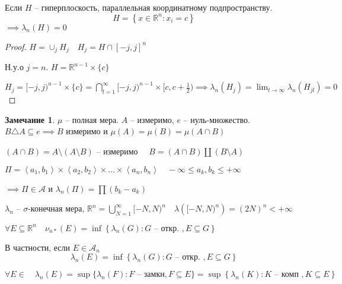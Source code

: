 \documentclass{book}
\newcommand\R{\ensuremath{\mathbb{R}}}
\theoremstyle{definition}
\newtheorem*{note}{Замечание}
\begin{document}
\begin{definition}
    Если $H$ -- гиперплоскость, параллельная координатному подпространству.  \[H = \left\{ x\in \R^n: x_i = c \right\} \] $\implies \lambda_n(H) = 0$
\end{definition}
\begin{proof}
    $H = \cup_j H_j\quad H_j = H \cap [-j,j]^n$

    Н.у.о $j = n$.  $H = \R^{n-1}\times \{c\}$

    $H_j = [-j,j)^{n-1} \times \{c\} = \bigcap\limits_{l=1} ^{\infty } [-j,j)^{n-1}\times [c,c+\frac{1}{2}) \implies \lambda_n(H_j) = \lim_{l \to \infty} \lambda_n(H_{jl}) = 0$
\end{proof}

\begin{note}
    $\mu$ -- полная мера.  $A$ -- измеримо,  $e$ -- нуль-множество.  $B \triangle A \subseteq e \implies B$ измеримо и $\mu(A) = \mu(B) = \mu(A\cap B)$ 

    $\left( A\cap B \right)  = A\setminus \left( A\setminus B \right) $ -- измеримо $\quad B = \left( A\cap B \right) \coprod \left( B \setminus A \right) $
\end{note}

\begin{statement}
    $\Pi = \left<a_1, b_1 \right> \times \left<a_2, b_2 \right>\times  \ldots \times \left<a_n, b_n \right>\quad -\infty  \leqslant a_k,b_k \leqslant +\infty $

    $\implies \Pi\in \mathcal A$ и $\lambda_n(\Pi) = \prod \left( b_k-a_k \right) $
\end{statement}

\begin{statement}
    $\lambda_n$ --  $\sigma$-конечная мера,  $\R^n = \bigcup\limits_{N=1}^{\infty}[-N, N)^n\quad \lambda\left( [-N, N)^n \right) =\left( 2N \right) ^n < +\infty  $
\end{statement}

\begin{statement}
    $\forall E\subseteq \R^n\quad \nu_{n*}(E) = \inf \left\{ \lambda_n(G): G \text{ -- откр. }, E\subseteq G \right\}$

    В частности, если $E\in \mathcal A_n$ \[\lambda_n(E) = \inf\left\{ \lambda_n(G): G \text{ -- откр. }, E\subseteq G \right\} \]
\end{statement}

\begin{statement}
    $\forall E \in \mathcal\quad \lambda_n(E) = \sup\{\lambda_n(F): F \text{ -- замкн}, F\subseteq E\} = \sup \left\{ \lambda_n(K): K \text{ -- комп }, K \subseteq E \right\} $
\end{statement}
\end{document}
